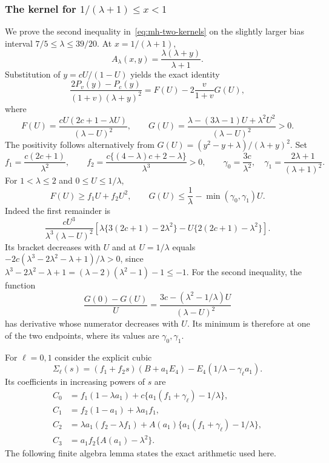 \subsubsection{The kernel for \texorpdfstring{$1/(\lambda+1)\le x<1$}{1/(lambda+1) <= x < 1}}
We prove the second inequality in~\eqref{eq:mh-two-kernels} on the slightly larger bias interval $7/5\le\lambda\le39/20$. At $x=1/(\lambda+1)$,
\[
 A_\lambda(x,y)=\frac{\lambda(\lambda+y)}{\lambda+1}.
\]
Substitution of $y=cU/(1-U)$ yields the exact identity
\begin{equation}\label{eq:mh-high-FG}
 \frac{2P_v(y)-P_c(y)}{(1+v)(\lambda+y)^2}
 =F(U)-2\frac{v}{1+v}G(U),
\end{equation}
where
\[
 F(U)=\frac{cU(2c+1-\lambda U)}{(\lambda-U)^2},\qquad
 G(U)=\frac{\lambda-(3\lambda-1)U+\lambda^2U^2}{(\lambda-U)^2}>0.
\]
The positivity follows alternatively from $G(U)=(y^2-y+\lambda)/(\lambda+y)^2$.
Set
\[
 f_1=\frac{c(2c+1)}{\lambda^2},\qquad
 f_2=\frac{c\{(4-\lambda)c+2-\lambda\}}{\lambda^3}>0,
 \qquad \gamma_0=\frac{3c}{\lambda^2},\quad
 \gamma_1=\frac{2\lambda+1}{(\lambda+1)^2}.
\]
For $1<\lambda\le2$ and $0\le U\le1/\lambda$,
\begin{equation}\label{eq:mh-high-FG-bounds}
 F(U)\ge f_1U+f_2U^2,\qquad
 G(U)\le\frac1\lambda-\min(\gamma_0,\gamma_1)U.
\end{equation}
Indeed the first remainder is
\[
 \frac{cU^3}{\lambda^3(\lambda-U)^2}
 \left[\lambda\{3(2c+1)-2\lambda^2\}
       -U\{2(2c+1)-\lambda^2\}\right].
\]
Its bracket decreases with $U$ and at $U=1/\lambda$ equals
$-2c(\lambda^3-2\lambda^2-\lambda+1)/\lambda>0$, since
$\lambda^3-2\lambda^2-\lambda+1=(\lambda-2)(\lambda^2-1)-1\le-1$.
For the second inequality, the function
\[
 \frac{G(0)-G(U)}U
 =\frac{3c-(\lambda^2-1/\lambda)U}{(\lambda-U)^2}
\]
has derivative whose numerator decreases with $U$. Its minimum is therefore at one of the two endpoints, where its values are $\gamma_0,\gamma_1$.

For $\ell=0,1$ consider the explicit cubic
\begin{equation}\label{eq:mh-high-sigma}
 \Sigma_\ell(s)=(f_1+f_2s)(B+a_1E_4)
                 -E_4(1/\lambda-\gamma_\ell a_1).
\end{equation}
Its coefficients in increasing powers of $s$ are
\begin{align*}
 C_0&=f_1(1-\lambda a_1)+c\{a_1(f_1+\gamma_\ell)-1/\lambda\},\\
 C_1&=f_2(1-a_1)+\lambda a_1f_1,\\
 C_2&=\lambda a_1(f_2-\lambda f_1)+A(a_1)\{a_1(f_1+\gamma_\ell)-1/\lambda\},\\
 C_3&=a_1f_2\{A(a_1)-\lambda^2\}.
\end{align*}
The following finite algebra lemma states the exact arithmetic used here.

